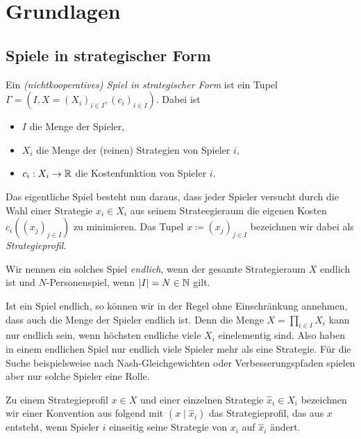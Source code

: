 \section{Grundlagen}\label{sec:Grundlagen}

\subsection{Spiele in strategischer Form}

\begin{defn}
	Ein \emph{(nichtkooperatives) Spiel in strategischer Form} ist ein Tupel $\Gamma = (I, X = (X_i)_{i \in I}, (c_i)_{i\in I})$. Dabei ist
	\begin{itemize}
		\item $I$ die Menge der Spieler,
		\item $X_i$ die Menge der (reinen) Strategien von Spieler $i$,
		\item $c_i: X_i \to \mathbb{R}$ die Kostenfunktion von Spieler $i$.
	\end{itemize}
	Das eigentliche Spiel besteht nun daraus, dass jeder Spieler versucht durch die Wahl einer Strategie $x_i \in X_i$ aus seinem Strateegieraum die eigenen Kosten $c_i((x_j)_{j \in I})$ zu minimieren. Das Tupel $x \coloneqq (x_j)_{j \in I}$ bezeichnen wir dabei als \emph{Strategieprofil}.
	
	Wir nennen ein solches Spiel \emph{endlich}, wenn der gesamte Strategieraum $X$ endlich ist und $N$-Personenspiel, wenn $\left|I\right| = N \in \mathbb{N}$ gilt.
\end{defn}

\begin{beob}
	Ist ein Spiel endlich, so können wir in der Regel ohne Einschränkung annehmen, dass auch die Menge der Spieler endlich ist. Denn die Menge $X = \prod_{i\in I} X_i$ kann nur endlich sein, wenn höchsten endliche viele $X_i$ einelementig sind. Also haben in einem endlichen Spiel nur endlich viele Spieler mehr als eine Strategie. Für die Suche beispielsweise nach Nash-Gleichgewichten oder Verbesserungspfaden spielen aber nur solche Spieler eine Rolle. 
\end{beob}

\begin{notation}
	Zu einem Strategieprofil $x \in X$ und einer einzelnen Strategie $\hat{x}_i \in X_i$ bezeichnen wir einer Konvention aus \cite{Polyequilibrium} folgend mit $(x \mid \hat{x}_i)$ das Strategieprofil, das aus $x$ entsteht, wenn Spieler $i$ einseitig seine Strategie von $x_i$ auf $\hat{x}_i$ ändert.
\end{notation}

